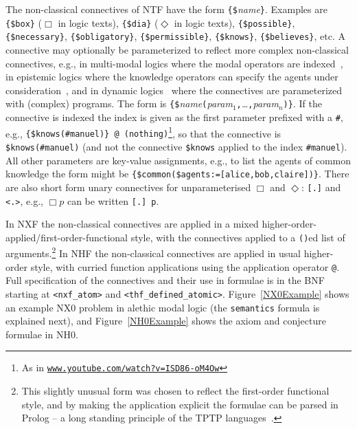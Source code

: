 \documentclass{ceurart}
\begin{document}
The non-classical connectives of NTF have the form {\tt \{\$}{\em name}{\tt \}}.
Examples are {\tt \{\$box\}} ($\Box$ in logic texts), {\tt \{\$dia\}} ($\Diamond$ in logic texts), 
{\tt \{\$possible\}}, {\tt \{\$necessary\}}, {\tt \{\$obligatory\}}, {\tt \{\$permissible\}}, 
{\tt \{\$knows\}}, {\tt \{\$believes\}}, etc.
A connective may optionally be parameterized to reflect more complex non-classical connectives,
e.g., in multi-modal logics where the modal operators are indexed~\cite{Bal98}, in epistemic logics
where the knowledge operators can specify the agents under consideration~\cite{vDH15},
and in dynamic logics~\cite{HKT00} where the connectives are parameterized with (complex) programs.
The form is
{\tt \verb|{|\$}{\em name}{\tt (}{\em param$_1$}{\tt ,}{\em \ldots}{\tt ,}{\em param$_n$}{\tt )}{\tt \verb|}|}.
If the connective is indexed the index is given as the first parameter prefixed with a {\tt \#},
e.g., {\tt \{\$knows(\#manuel)\}~@~(nothing)}\footnote{%
As in \href{https://www.youtube.com/watch?v=ISD86-oM4Ow}{\tt www.youtube.com/watch?v=ISD86-oM4Ow}},
so that the connective is {\tt \$knows(\#manuel)} (and not the connective {\tt \$knows} applied
to the index {\tt \#manuel}).
All other parameters are key-value assignments, e.g., to list the agents of common knowledge the
form might be {\tt \{\$common(\$agents:=[alice,bob,claire])\}}.
There are also short form unary connectives for unparameterised $\Box$ and $\Diamond$: {\tt [.]} 
and {\tt <.>}, e.g., $\Box p$ can be written {\tt [.]~p}.

In NXF the non-classical connectives are applied in a mixed 
higher-order-applied/first-order-functional style, with the connectives applied to a
{\tt ()}ed list of arguments.\footnote{%
This slightly unusual form was chosen to reflect the first-order functional style, and by making
the application explicit the formulae can be parsed in Prolog -- a long standing principle of the
TPTP languages~\cite{SZS04}.}
In NHF the non-classical connectives are applied in usual higher-order style, with curried 
function applications using the application operator {\tt @}.
Full specification of the connectives and their use in formulae is in the BNF
starting at {\tt <nxf\_atom>} and {\tt <thf\_defined\_atomic>}.
Figure~\ref{NX0Example} shows an example NX0 problem in alethic modal logic (the {\tt semantics} 
formula is explained next), and Figure~\ref{NH0Example} shows the axiom and conjecture formulae 
in NH0.
\end{document}
